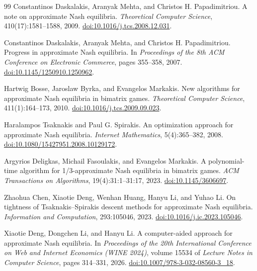 \documentclass[11pt]{article}
\theoremstyle{remark}
\theoremstyle{plain}
\begin{document}
\begin{thebibliography}{99}
Constantinos Daskalakis, Aranyak Mehta, and Christos H. Papadimitriou.
\newblock A note on approximate Nash equilibria.
\newblock \emph{Theoretical Computer Science}, 410(17):1581--1588, 2009.
\newblock \href{https://doi.org/10.1016/j.tcs.2008.12.031}{doi:10.1016/j.tcs.2008.12.031}.

Constantinos Daskalakis, Aranyak Mehta, and Christos H. Papadimitriou.
\newblock Progress in approximate Nash equilibria.
\newblock In \emph{Proceedings of the 8th ACM Conference on Electronic
Commerce}, pages 355--358, 2007.
\newblock \href{https://doi.org/10.1145/1250910.1250962}{doi:10.1145/1250910.1250962}.

Hartwig Bosse, Jaroslaw Byrka, and Evangelos Markakis.
\newblock New algorithms for approximate Nash equilibria in bimatrix games.
\newblock \emph{Theoretical Computer Science}, 411(1):164--173, 2010.
\newblock \href{https://doi.org/10.1016/j.tcs.2009.09.023}{doi:10.1016/j.tcs.2009.09.023}.

Haralampos Tsaknakis and Paul G. Spirakis.
\newblock An optimization approach for approximate Nash equilibria.
\newblock \emph{Internet Mathematics}, 5(4):365--382, 2008.
\newblock \href{https://doi.org/10.1080/15427951.2008.10129172}{doi:10.1080/15427951.2008.10129172}.

Argyrios Deligkas, Michail Fasoulakis, and Evangelos Markakis.
\newblock A polynomial-time algorithm for 1/3-approximate Nash equilibria in
bimatrix games.
\newblock \emph{ACM Transactions on Algorithms}, 19(4):31:1--31:17, 2023.
\newblock \href{https://doi.org/10.1145/3606697}{doi:10.1145/3606697}.

Zhaohua Chen, Xiaotie Deng, Wenhan Huang, Hanyu Li, and Yuhao Li.
\newblock On tightness of Tsaknakis--Spirakis descent methods for approximate
Nash equilibria.
\newblock \emph{Information and Computation}, 293:105046, 2023.
\newblock \href{https://doi.org/10.1016/j.ic.2023.105046}{doi:10.1016/j.ic.2023.105046}.

Xiaotie Deng, Dongchen Li, and Hanyu Li.
\newblock A computer-aided approach for approximate Nash equilibria.
\newblock In \emph{Proceedings of the 20th International Conference on Web
and Internet Economics (WINE 2024)}, volume 15534 of \emph{Lecture Notes in
Computer Science}, pages 314--331, 2026.
\newblock \href{https://doi.org/10.1007/978-3-032-08560-3_18}{doi:10.1007/978-3-032-08560-3\_18}.


\end{thebibliography}
\end{document}
